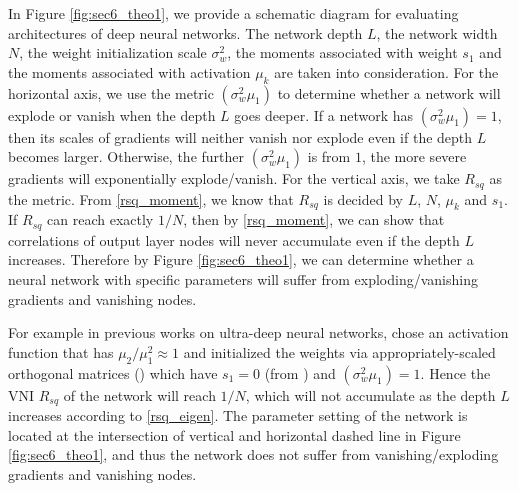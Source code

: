 In Figure \ref{fig:sec6_theo1}, we provide a schematic diagram for evaluating architectures
of deep neural networks. The network depth $L$, the network width $N$, the weight initialization scale
$\sigma_w^2$, the moments associated with weight $s_1$ and the moments associated with activation
$\mu_k$ are taken into consideration. For the horizontal axis, we use the metric $(\sigma_w^2\mu_1)$
to determine whether a network will explode or vanish when the depth $L$ goes deeper. If a network has
$(\sigma_w^2\mu_1)=1$, then its scales of gradients will neither vanish nor explode even if the depth
$L$ becomes larger. Otherwise, the further $(\sigma_w^2\mu_1)$ is from $1$, the more severe gradients
will exponentially explode/vanish. For the vertical axis, we take $R_{sq}$ as the metric. From
\eqref{rsq_moment}, we know that $R_{sq}$ is decided by $L$, $N$, $\mu_k$ and $s_1$. If $R_{sq}$ can
reach exactly $1/N$, then by \eqref{rsq_moment}, we can show  that correlations of output layer nodes
will never accumulate even if the depth $L$ increases. Therefore by Figure \ref{fig:sec6_theo1}, we can
determine whether a neural network with specific parameters will suffer from exploding/vanishing
gradients and vanishing nodes.

For example in previous works on ultra-deep neural networks, \cite{mft:cnn} chose an activation
function that has $\mu_2/\mu_1^2\approx1$ and initialized the weights via appropriately-scaled
orthogonal matrices (\cite{mft:linear}) which have $s_1=0$ (from \cite{mft:sigmoid}) and
$(\sigma_w^2\mu_1)=1$. Hence the VNI $R_{sq}$ of the network will reach $1/N$, which will not
accumulate as the depth $L$ increases according to \eqref{rsq_eigen}. The parameter setting of the
network is located at the intersection of vertical and horizontal dashed line in Figure
\ref{fig:sec6_theo1}, and thus the network does not suffer from vanishing/exploding gradients
and vanishing nodes.

